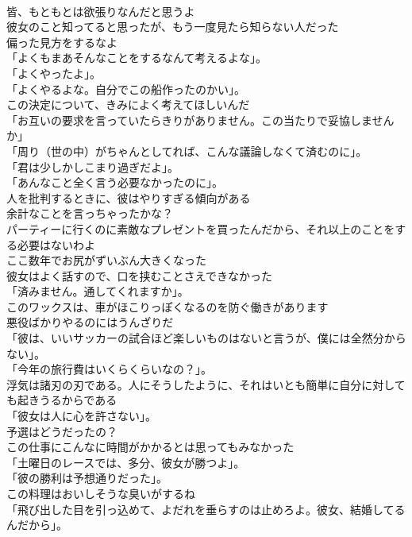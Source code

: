 \documentclass[8pt]{extreport}
\begin{document}
\begin{CJK}{UTF8}{min}
\\	皆、もともとは欲張りなんだと思うよ	
\\	彼女のこと知ってると思ったが、もう一度見たら知らない人だった	
\\	偏った見方をするなよ	
\\	「よくもまあそんなことをするなんて考えるよな」。	
\\	「よくやったよ」。	
\\	「よくやるよな。自分でこの船作ったのかい」。	
\\	この決定について、きみによく考えてほしいんだ	
\\	「お互いの要求を言っていたらきりがありません。この当たりで妥協しませんか」	
\\	「周り（世の中）がちゃんとしてれば、こんな議論しなくて済むのに」。	
\\	「君は少しかしこまり過ぎだよ」。	
\\	「あんなこと全く言う必要なかったのに」。	
\\	人を批判するときに、彼はやりすぎる傾向がある	
\\	余計なことを言っちゃったかな？	
\\	パーティーに行くのに素敵なプレゼントを買ったんだから、それ以上のことをする必要はないわよ	
\\	ここ数年でお尻がずいぶん大きくなった	
\\	彼女はよく話すので、口を挟むことさえできなかった	
\\	「済みません。通してくれますか」。	
\\	このワックスは、車がほこりっぽくなるのを防ぐ働きがあります	
\\	悪役ばかりやるのにはうんざりだ	
\\	「彼は、いいサッカーの試合ほど楽しいものはないと言うが、僕には全然分からない」。	
\\	「今年の旅行費はいくらくらいなの？」。	
\\	浮気は諸刃の刃である。人にそうしたように、それはいとも簡単に自分に対しても起きうるからである	
\\	「彼女は人に心を許さない」。	
\\	予選はどうだったの？	
\\	この仕事にこんなに時間がかかるとは思ってもみなかった	
\\	「土曜日のレースでは、多分、彼女が勝つよ」。	
\\	「彼の勝利は予想通りだった」。	
\\	この料理はおいしそうな臭いがするね	
\\	「飛び出した目を引っ込めて、よだれを垂らすのは止めろよ。彼女、結婚してるんだから」。	

\end{CJK}
\end{document}
